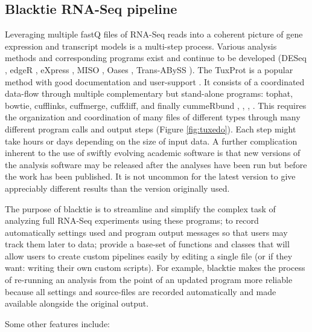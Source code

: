 \subsection{Blacktie RNA-Seq pipeline}
Leveraging multiple fastQ files of \gls{RNA-Seq} reads into a coherent picture of gene expression and transcript models is a multi-step process.
Various analysis methods and corresponding programs exist and continue to be developed (DESeq \cite{Anders2010}, edgeR \cite{Robinson2010a}, eXpress \cite{Roberts2013}, MISO \cite{Katz2010}, Oases \cite{Schulz2012}, Trans-ABySS \cite{Robertson2010}).
The \gls{TuxProt} is a popular method with good documentation and user-support \cite{Trapnell2012}.
It consists of a coordinated data-flow through multiple complementary but stand-alone programs: \gls{tophat}, \gls{bowtie}, \gls{cufflinks}, \gls{cuffmerge}, \gls{cuffdiff}, and finally \gls{cummeRbund} \cite{Kim2013}, \cite{Langmead2012}, \cite{Trapnell2010}, \cite{Goff2012}.
This requires the organization and coordination of many files of different types through many different program calls and output steps (Figure \ref{fig:tuxedo}).
Each step might take hours or days depending on the size of input data.
A further complication inherent to the use of swiftly evolving academic software is that new versions of the analysis software may be released after the analyses have been run but before the work has been published.
It is not uncommon for the latest version to give appreciably different results than the version originally used.



The purpose of \gls{blacktie} is to streamline and simplify the complex task of analyzing full \gls{RNA-Seq} experiments using these programs; to record automatically settings used and program output messages so that users may track them later to data; provide a base-set of functions and classes that will allow users to create custom pipelines easily by editing a single file (or if they want: writing their own custom scripts).
For example, \gls{blacktie} makes the process of re-running an analysis from the point of an updated program more reliable because all settings and source-files are recorded automatically and made available alongside the original output.


Some other features include:


